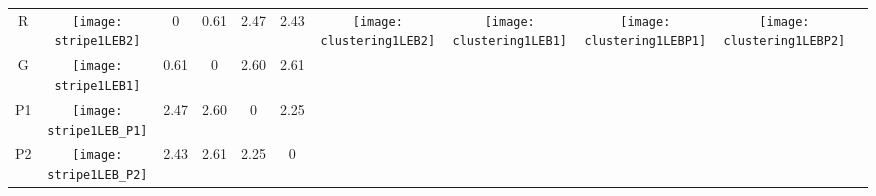 \documentclass[a4paper,11pt,twoside]{book}%
\begin{document}
\begin{appendices}
\begin{sidewaystable}[h!]
\begin{tabular*}{4cm}{cc|c|c|c|c|c|c|c|c|c|}
\cline{1-10}
\multicolumn{1}{|c|}{R} & \texttt{[image: stripe1LEB2]} & 0 & 0.61 & 2.47 & 2.43 & \multirow{4}{*}{\vspace{-0.3cm}\texttt{[image: clustering1LEB2]}} & \multirow{4}{*}{\vspace{-0.3cm}\texttt{[image: clustering1LEB1]}} & \multirow{4}{*}{\vspace{-0.3cm}\texttt{[image: clustering1LEBP1]}} & \multirow{4}{*}{\vspace{-0.3cm}\texttt{[image: clustering1LEBP2]}} &  \multirow{5}{*}{} \\
\cline{1-6}
\multicolumn{1}{|c|}{G} & \texttt{[image: stripe1LEB1]} & 0.61 & 0 & 2.60 & 2.61 & \multirow{4}{*}{} & \multirow{4}{*}{} & \multirow{4}{*}{} & \multirow{4}{*}{} & \multirow{5}{*}{} \\
\cline{1-6}
\multicolumn{1}{|c|}{P1} & \texttt{[image: stripe1LEB\_P1]} & 2.47 & 2.60 & 0 & 2.25 & \multirow{4}{*}{} & \multirow{4}{*}{} & \multirow{4}{*}{} & \multirow{4}{*}{} & \multirow{5}{*}{}  \\
\cline{1-6}
\multicolumn{1}{|c|}{P2} & \texttt{[image: stripe1LEB\_P2]} & 2.43 & 2.61 & 2.25 & 0 & \multirow{4}{*}{} & \multirow{4}{*}{} & \multirow{4}{*}{} & \multirow{4}{*}{} & \multirow{5}{*}{}  \\
\cline{1-11}
\end{tabular*}
\normalfont
\end{sidewaystable}



\end{appendices}
\end{document}
